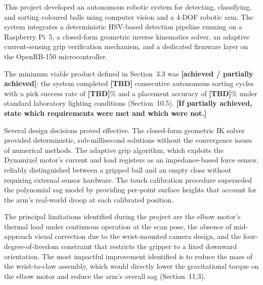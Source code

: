
This project developed an autonomous robotic system for
detecting, classifying, and sorting coloured balls using
computer vision and a 4-DOF robotic arm. The system integrates
a deterministic HSV-based detection pipeline running on a
Raspberry Pi~5, a closed-form geometric inverse kinematics
solver, an adaptive current-sensing grip verification mechanism,
and a dedicated firmware layer on the OpenRB-150 microcontroller.

The minimum viable product defined in Section~3.3 was
\textbf{[achieved / partially achieved]}: the system completed
\textbf{[TBD]} consecutive autonomous sorting cycles with a pick
success rate of \textbf{[TBD]}\% and a placement accuracy of
\textbf{[TBD]}\% under standard laboratory lighting conditions
(Section~10.5). \textbf{[If partially achieved, state which
requirements were met and which were not.]}

Several design decisions proved effective. The closed-form
geometric IK solver provided deterministic, sub-millisecond
solutions without the convergence issues of numerical methods.
The adaptive grip algorithm, which exploits the Dynamixel
motor's current and load registers as an impedance-based force
sensor, reliably distinguished between a gripped ball and an
empty close without requiring external sensor hardware. The
touch calibration procedure superseded the polynomial sag model
by providing per-point surface heights that account for the
arm's real-world droop at each calibrated position.

The principal limitations identified during the project are the
elbow motor's thermal load under continuous operation at the scan
pose, the absence of mid-approach visual correction due to the
wrist-mounted camera design, and the four-degree-of-freedom
constraint that restricts the gripper to a fixed downward
orientation. The most impactful improvement identified is to
reduce the mass of the wrist-to-claw assembly, which would
directly lower the gravitational torque on the elbow motor and
reduce the arm's overall sag (Section~11.3).
